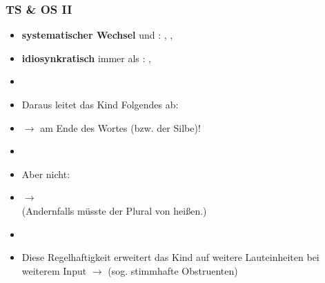 \begin{frame}
\frametitle{TS \& OS II}
		
	\begin{itemize}
		\item \textbf{systematischer Wechsel} \textipa{[d]} und \textipa{[t]}: \zB {}, , 
		\item \textbf{idiosynkratisch} \textipa{[t]} immer als \textipa{[t]}: \zB {}, 
		\item[]
		\item Daraus leitet das Kind Folgendes ab:
		\item[]  $\rightarrow$ \textipa{[t]} am Ende des Wortes (bzw. der Silbe)!
		\item[]
		\item[] Aber nicht:
		\item[]  $\rightarrow$ \textipa{[d]}\\ (Andernfalls müsste der Plural von   heißen.)
	
	\item[]
	\item Diese Regelhaftigkeit erweitert das Kind auf weitere Lauteinheiten bei weiterem Input $\rightarrow$ 	(sog. stimmhafte Obstruenten)
\end{itemize}

\end{frame}
	

